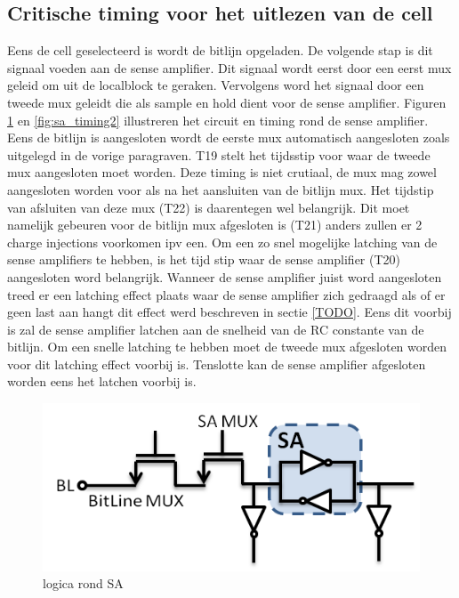 \subsection{Critische timing voor het uitlezen van de cell}
Eens de cell geselecteerd is wordt de bitlijn opgeladen. De volgende stap is dit signaal voeden aan de sense amplifier. Dit signaal wordt eerst door een eerst mux geleid om uit de localblock te geraken. Vervolgens word het signaal door een tweede mux geleidt die als sample en hold dient voor de sense amplifier. Figuren \ref{fig:sa_timing1} en \ref{fig:sa_timing2} illustreren het circuit en timing rond de sense amplifier. Eens de bitlijn is aangesloten wordt de eerste mux automatisch aangesloten zoals uitgelegd in de vorige paragraven. T19 stelt het tijdsstip voor waar de tweede mux aangesloten moet worden. Deze timing is niet crutiaal, de mux mag zowel aangesloten worden voor als na het aansluiten van de bitlijn mux. Het tijdstip van afsluiten van deze mux (T22) is daarentegen wel belangrijk. Dit moet namelijk gebeuren voor de bitlijn mux afgesloten is (T21) anders zullen er 2 charge injections voorkomen ipv een. Om een zo snel mogelijke latching van de sense amplifiers te hebben, is het tijd stip waar de sense amplifier (T20) aangesloten word belangrijk. Wanneer de sense amplifier juist word aangesloten treed er een latching effect plaats waar de sense amplifier zich gedraagd als of er geen last aan hangt dit effect werd beschreven in sectie \ref{TODO}. Eens dit voorbij is zal de sense amplifier latchen aan de snelheid van de RC constante van de bitlijn. Om een snelle latching te hebben moet de tweede mux afgesloten worden voor dit latching effect voorbij is.
Tenslotte kan de sense amplifier afgesloten worden eens het latchen voorbij is.

\begin{figure}[!ht]
  \centering
  \includegraphics[scale=0.6]{../fig/hfdstk-timing-sa1.png}
  \caption{logica rond SA}
  \label{fig:sa_timing1}
\end{figure}

